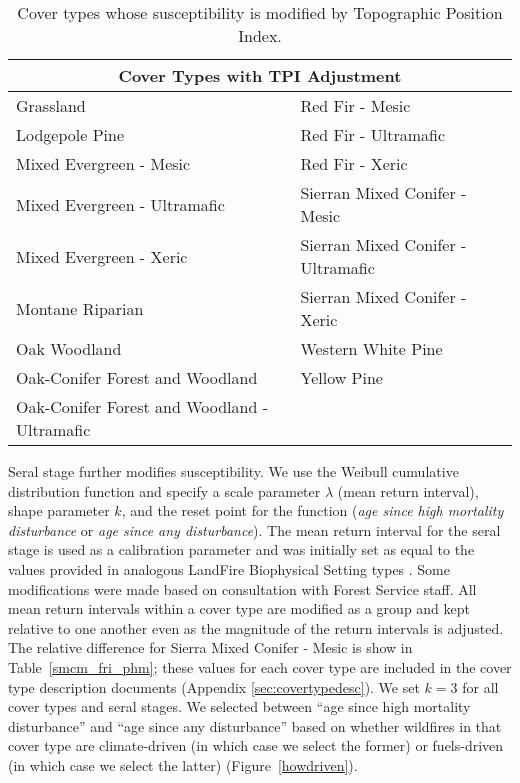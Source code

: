 \begin{itemize}
\begin{table}[htbp]
\small
\centering
\caption{Cover types whose susceptibility is modified by Topographic Position Index.}
\label{covtpi}
\begin{tabular}{ll}
\hline
\multicolumn{2}{c}{\textbf{Cover Types with TPI Adjustment}} \\
\hline
Grassland     									& Red Fir - Mesic   					\\
Lodgepole Pine    								& Red Fir - Ultramafic					\\
Mixed Evergreen - Mesic							& Red Fir - Xeric    					\\
Mixed Evergreen - Ultramafic     				& Sierran Mixed Conifer - Mesic    		\\
Mixed Evergreen - Xeric 						& Sierran Mixed Conifer - Ultramafic 	\\
Montane Riparian								& Sierran Mixed Conifer - Xeric 		\\
Oak Woodland 									& Western White Pine					\\
Oak-Conifer Forest and Woodland 				& Yellow Pine 							\\
Oak-Conifer Forest and Woodland - Ultramafic 	&										\\
\hline
\end{tabular}

\end{table}

Seral stage further modifies susceptibility. We use the Weibull cumulative distribution function and specify a scale parameter $\lambda$ (mean return interval), shape parameter $k$, and the reset point for the function (\emph{age since high mortality disturbance} or \emph{age since any disturbance}). The mean return interval for the seral stage is used as a calibration parameter and was initially set as equal to the values provided in analogous LandFire Biophysical Setting types \citep{Landfire2007}. Some modifications were made based on consultation with Forest Service staff. All mean return intervals within a cover type are modified as a group and kept relative to one another even as the magnitude of the return intervals is adjusted. The relative difference for Sierra Mixed Conifer - Mesic is show in Table~\ref{smcm_fri_phm}; these values for each cover type are included in the cover type description documents (Appendix \ref{sec:covertypedesc}). We set $k=3$ for all cover types and seral stages. We selected between ``age since high mortality disturbance'' and ``age since any disturbance'' based on whether wildfires in that cover type are climate-driven (in which case we select the former) or fuels-driven (in which case we select the latter) (Figure~\ref{howdriven}).


\end{itemize}
